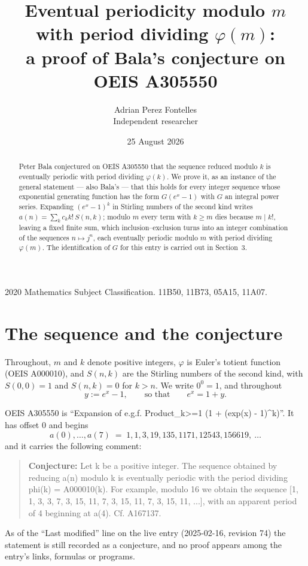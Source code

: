 \documentclass[11pt,a4paper]{article}
\title{Eventual periodicity modulo $m$ with period dividing $\varphi(m)$:\\a proof of Bala's conjecture on OEIS A305550}
\author{Adrian Perez Fontelles\\ \small Independent researcher}
\date{25 August 2026}
\theoremstyle{plain}
\theoremstyle{definition}
\begin{document}
\maketitle

\begin{abstract}
Peter Bala conjectured on OEIS A305550 that the sequence reduced modulo $k$ is eventually periodic with period dividing $\varphi(k)$. We prove it, as an instance of the general statement --- also Bala's --- that this holds for every integer sequence whose exponential generating function has the form $G(e^{x}-1)$ with $G$ an integral power series. Expanding $(e^{x}-1)^{k}$ in Stirling numbers of the second kind writes $a(n)=\sum_{k}c_{k}k!\,S(n,k)$; modulo $m$ every term with $k\ge m$ dies because $m\mid k!$, leaving a fixed finite sum, which inclusion--exclusion turns into an integer combination of the sequences $n\mapsto j^{n}$, each eventually periodic modulo $m$ with period dividing $\varphi(m)$. The identification of $G$ for this entry is carried out in Section~3.
\end{abstract}

\noindent\small 2020 Mathematics Subject Classification. 11B50, 11B73, 05A15, 11A07.\normalsize

\section{The sequence and the conjecture}

Throughout, $m$ and $k$ denote positive integers, $\varphi$ is Euler's totient function
(OEIS A000010), and $S(n,k)$ are the Stirling numbers of the second kind, with
$S(0,0)=1$ and $S(n,k)=0$ for $k>n$. We write $0^{0}=1$, and throughout
\[
y := e^{x}-1, \qquad\text{so that}\qquad e^{x}=1+y .
\]

OEIS A305550 is ``Expansion of e.g.f. Product\_{k>=1} (1 + (exp(x) - 1)\^{}k)''. It has offset $0$ and begins
\[
a(0),\dots,a(7)\;=\;1, 1, 3, 19, 135, 1171, 12543, 156619,\ \dots
\]
and it carries the following comment:
\begin{quote}\small
\textbf{Conjecture:} Let k be a positive integer. The sequence obtained by reducing a(n) modulo k is eventually periodic with the period dividing phi(k) = A000010(k). For example, modulo 16 we obtain the sequence [1, 1, 3, 3, 7, 3, 15, 11, 7, 3, 15, 11, 7, 3, 15, 11, ...], with an apparent period of 4 beginning at a(4). Cf. A167137.
\end{quote}
As of the ``Last modified'' line on the live entry (2025-02-16, revision 74) the
statement is still recorded as a conjecture, and no proof appears among the entry's links,
formulas or programs.
\end{document}
